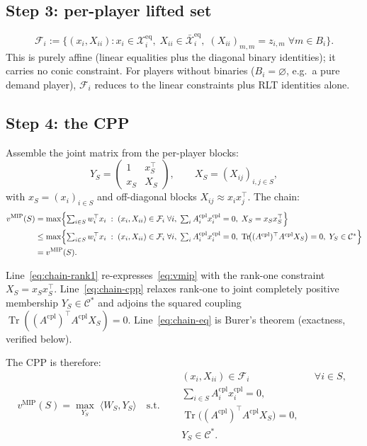 \documentclass[11pt]{article}
\theoremstyle{definition}
\newcommand{\CP}{\mathcal{C}^{*}}
\newcommand{\inner}[2]{\langle #1, #2 \rangle}
\newcommand{\Tr}{\operatorname{Tr}}
\newcommand{\xcom}{x^{\mathrm{cpl}}}
\newcommand{\Acom}{A^{\mathrm{cpl}}}
\newcommand{\feaseq}{\mathcal{X}^{\mathrm{eq}}}
\newcommand{\feasbar}{\bar{\mathcal{X}}^{\mathrm{eq}}}
\newcommand{\liftset}{\mathcal{F}}
\newcommand{\vmip}{v^{\mathrm{MIP}}}
\begin{document}
\subsection{Step 3: per-player lifted set}

\begin{equation}
\liftset_i:=\bigl\{(x_i,X_{ii}):
  x_i\in\feaseq_i,\;X_{ii}\in\feasbar_i,\;
  (X_{ii})_{m,m}=z_{i,m}\;\forall m\in B_i\bigr\}.
\label{eq:Fi}
\end{equation}
This is purely affine (linear equalities plus the diagonal binary
identities); it carries no conic constraint.  For players without
binaries ($B_i=\varnothing$, e.g.\ a pure demand player), $\liftset_i$
reduces to the linear constraints plus RLT identities alone.

\subsection{Step 4: the CPP}

Assemble the joint matrix from the per-player blocks:
\[
Y_S=\begin{pmatrix}1 & x_S^{\top}\\ x_S & X_S\end{pmatrix},
\qquad X_S=(X_{ij})_{i,j\in S},
\]
with $x_S=(x_i)_{i\in S}$ and off-diagonal blocks $X_{ij}\approx
x_ix_j^{\top}$.  The chain:
\begin{align}
\vmip(S)
&=\max\Bigl\{\textstyle\sum_{i\in S}w_i^{\top}x_i\;:\;
  (x_i,X_{ii})\in\liftset_i\;\forall i,\;
  \textstyle\sum_i\Acom_i\xcom_i=0,\;
  X_S=x_Sx_S^{\top}\Bigr\}
\label{eq:chain-rank1}\\
&\le\max\Bigl\{\textstyle\sum_{i\in S}w_i^{\top}x_i\;:\;
  (x_i,X_{ii})\in\liftset_i\;\forall i,\;
  \textstyle\sum_i\Acom_i\xcom_i=0,\;
  \Tr\!\bigl((\Acom)^{\top}\Acom X_S\bigr)=0,\;
  Y_S\in\CP\Bigr\}
\label{eq:chain-cpp}\\
&=\vmip(S).
\label{eq:chain-eq}
\end{align}

Line~\eqref{eq:chain-rank1} re-expresses~\eqref{eq:vmip} with the
rank-one constraint $X_S=x_Sx_S^{\top}$.
Line~\eqref{eq:chain-cpp} relaxes rank-one to joint completely positive
membership $Y_S\in\CP$ and adjoins the squared coupling
$\Tr((\Acom)^{\top}\Acom X_S)=0$.
Line~\eqref{eq:chain-eq} is Burer's theorem (exactness, verified below).

The CPP is therefore:
\begin{equation}
\boxed{
\vmip(S)=\max_{Y_S}\;\inner{W_S}{Y_S}\quad
\text{s.t.}\quad
\begin{aligned}
&(x_i,X_{ii})\in\liftset_i&&\forall i\in S,\\
&\textstyle\sum_{i\in S}\Acom_i\xcom_i=0,\\
&\Tr\!\bigl((\Acom)^{\top}\Acom X_S\bigr)=0,\\
&Y_S\in\CP.
\end{aligned}}
\label{eq:cpp}
\end{equation}
\end{document}
